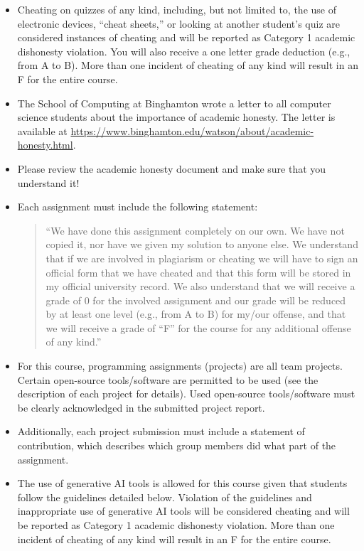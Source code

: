 \documentclass[11pt,article,oneside]{memoir} %
\begin{document}
\begin{itemize}
    \item Cheating on quizzes of any kind, including, but not limited to, the use of electronic devices, ``cheat sheets,'' or looking at another student's quiz are considered instances of cheating and will be reported as Category 1 academic dishonesty violation. You will also receive a one letter grade deduction (e.g., from A to B). More than one incident of cheating of any kind will result in an F for the entire course.
    \item The School of Computing at Binghamton wrote a letter to all computer science students about the importance of academic honesty. The letter is available at \url{https://www.binghamton.edu/watson/about/academic-honesty.html}.
    \item Please review the academic honesty document and make sure that you understand it!
    \item Each assignment must include the following statement:
    \begin{quote}
        ``We have done this assignment completely on our own. We have not copied it, nor have we given my solution to anyone else. We understand that if we are involved in plagiarism or cheating we will have to sign an official form that we have cheated and that this form will be stored in my official university record. We also understand that we will receive a grade of 0 for the involved assignment and our grade will be reduced by at least one level (e.g., from A to B) for my/our offense, and that we will receive a grade of ``F'' for the course for any additional offense of any kind.''
    \end{quote}
    \item For this course, programming assignments (projects) are all team projects. Certain open-source tools/software are permitted to be used (see the description of each project for details). Used open-source tools/software must be clearly acknowledged in the submitted project report.
    \item Additionally, each project submission must include a statement of contribution, which describes which group members did what part of the assignment.
    \item The use of generative AI tools is allowed for this course given that students follow the guidelines detailed below.
    Violation of the guidelines and inappropriate use of generative AI tools will be considered cheating and will be reported as Category 1 academic dishonesty violation.
    More than one incident of cheating of any kind will result in an F for the entire course.
\end{itemize}
\end{document}
